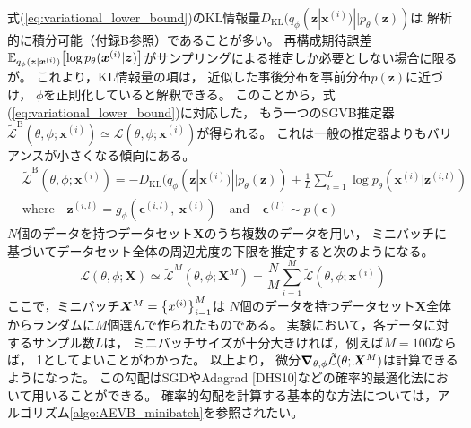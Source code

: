 \documentclass[dvipdfmx, fleqn, draft]{jsarticle}
\begin{document}
式(\ref{eq:variational_lower_bound})のKL情報量\(D_\mathrm{KL} (q_{\phi} (\bm{z} | \bm{x}^{(i)}) || p_{\theta} (\bm{z}))\)は
解析的に積分可能（付録B参照）であることが多い。
再構成期待誤差\(\mathbb{E}_{q_{\phi} (\bm{z} | \bm{x}^{(i)})} \qty[\log{p_{\theta} (\bm{x}^{(i)} | \bm{z})}]\)がサンプリングによる推定しか必要としない場合に限るが。
これより，KL情報量の項は，
近似した事後分布を事前分布\(p(\bm{z})\)に近づけ，
\(\phi\)を正則化していると解釈できる。
このことから，式(\ref{eq:variational_lower_bound})に対応した，
もう一つのSGVB推定器
\(\tilde{\mathcal{L}}^\mathrm{B} (\theta, \phi; \bm{x}^{(i)}) \simeq \mathcal{L} (\theta, \phi; \bm{x}^{(i)})\)が得られる。
これは一般の推定器よりもバリアンスが小さくなる傾向にある。
\begin{equation}
    \begin{split}
    & \tilde{\mathcal{L}}^\mathrm{B} (\theta, \phi; \bm{x}^{(i)})
        = - D_\mathrm{KL} (q_{\phi} (\bm{z} | \bm{x}^{(i)}) || p_{\theta} (\bm{z}))
            + \frac{1}{L} \sum_{i=1}^{L} \log{p_{\theta} (\bm{x}^{(i)} | \bm{z}^{(i, l)})} \\
    & \text{where} \quad
        \bm{z}^{(i, l)} = g_{\phi} (\bm{\epsilon}^{(i, l)},\ \bm{x}^{(i)})
        \quad \text{and} \quad
        \bm{\epsilon}^{(l)} \sim p(\bm{\epsilon})
    \end{split}
    \label{eq:SGVB_estimator_B}
\end{equation}
\(N\)個のデータを持つデータセット\(\bm{X}\)のうち複数のデータを用い，
ミニバッチに基づいてデータセット全体の周辺尤度の下限を推定すると次のようになる。
\begin{equation}
    \mathcal{L} (\theta, \phi; \bm{X})
        \simeq \tilde{\mathcal{L}}^{M} (\theta, \phi; \bm{X}^{M})
        = \frac{N}{M} \sum_{i=1}^{M} \tilde{\mathcal{L}} (\theta, \phi; \bm{x}^{(i)})
    \label{eq:variational_lower_bound_minibatch}
\end{equation}
ここで，ミニバッチ\(\bm{X}^{M} = \qty{x^{(i)}}_{i=1}^{M}\)は
\(N\)個のデータを持つデータセット\(\bm{X}\)全体からランダムに\(M\)個選んで作られたものである。
実験において，各データに対するサンプル数\(L\)は，
ミニバッチサイズが十分大きければ，例えば\(M = 100\)ならば，
1としてよいことがわかった。
以上より，
微分\(\grad_{\theta, \phi} \tilde{\mathcal{L}} (\theta; \bm{X}^{M})\)は計算できるようになった。
この勾配はSGDやAdagrad [DHS10]などの確率的最適化法において用いることができる。
確率的勾配を計算する基本的な方法については，アルゴリズム\ref{algo:AEVB_minibatch}を参照されたい。
\end{document}
